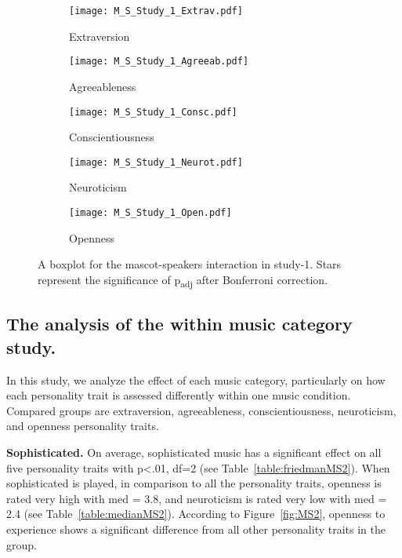\begin{figure}[hbt!]
    \centering
    \begin{subfigure}{.40\textwidth}
        \centering
        \texttt{[image: M\_S\_Study\_1\_Extrav.pdf]}
        \caption{Extraversion}
        \label{fig:sub1}
    \end{subfigure}\hfill%
    \begin{subfigure}{.40\textwidth}
        \centering
        \texttt{[image: M\_S\_Study\_1\_Agreeab.pdf]}
        \caption{Agreeableness}
        \label{fig:sub2}
    \end{subfigure}\hfill
    \begin{subfigure}{.40\textwidth}
        \centering
        \texttt{[image: M\_S\_Study\_1\_Consc.pdf]}
        \caption{Conscientiousness}
        \label{fig:sub1}
    \end{subfigure}\hfill%
    \begin{subfigure}{.40\textwidth}
        \centering
        \texttt{[image: M\_S\_Study\_1\_Neurot.pdf]}
        \caption{Neuroticism}
        \label{fig:sub1}
    \end{subfigure}\hfill%
    \begin{subfigure}{.40\textwidth}
        \centering
        \texttt{[image: M\_S\_Study\_1\_Open.pdf]}
        \caption{Openness}
        \label{fig:sub1}
    \end{subfigure}\hfill%
    \caption{A boxplot for the mascot-speakers interaction in study-1.
    Stars represent the significance of p\textsubscript{adj} after Bonferroni correction.}
    \label{fig:MS1}
\end{figure}
\subsection{The analysis of the within music category study.}
\label{subsec:MSstudy2}
In this study, we analyze the effect of each music category, particularly on how each personality
trait is assessed differently within one music condition.
Compared groups are extraversion, agreeableness, conscientiousness, neuroticism, and openness personality traits.

\par\textbf{Sophisticated.}
On average, sophisticated music has a significant effect on all five personality traits with
p<.01, df=2 (see Table~\ref{table:friedmanMS2}).
When sophisticated is played, in comparison to all the personality traits,
openness is rated very high with med = 3.8, and neuroticism
is rated very low with med = 2.4 (see Table~\ref{table:medianMS2}).
According to Figure~\ref{fig:MS2}, openness to experience shows a
significant difference from all other personality traits in the group.

